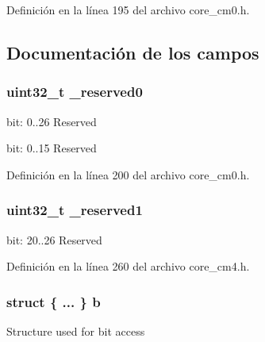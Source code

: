 Definición en la línea 195 del archivo core\+\_\+cm0.\+h.



\subsection{Documentación de los campos}
\subsubsection[{\texorpdfstring{\+\_\+reserved0}{_reserved0}}]{\setlength{\rightskip}{0pt plus 5cm}uint32\+\_\+t \+\_\+reserved0}\hypertarget{union_a_p_s_r___type_ac8a6a13838a897c8d0b8bc991bbaf7c1}{}\label{union_a_p_s_r___type_ac8a6a13838a897c8d0b8bc991bbaf7c1}
bit\+: 0..26 Reserved

bit\+: 0..15 Reserved 

Definición en la línea 200 del archivo core\+\_\+cm0.\+h.

\subsubsection[{\texorpdfstring{\+\_\+reserved1}{_reserved1}}]{\setlength{\rightskip}{0pt plus 5cm}uint32\+\_\+t \+\_\+reserved1}\hypertarget{union_a_p_s_r___type_a959a73d8faee56599b7e792a7c5a2d16}{}\label{union_a_p_s_r___type_a959a73d8faee56599b7e792a7c5a2d16}
bit\+: 20..26 Reserved 

Definición en la línea 260 del archivo core\+\_\+cm4.\+h.

\subsubsection[{\texorpdfstring{b}{b}}]{\setlength{\rightskip}{0pt plus 5cm}struct \{ ... \}   b}\hypertarget{union_a_p_s_r___type_a2e5b85cff450c7f92c7388dd09f10065}{}\label{union_a_p_s_r___type_a2e5b85cff450c7f92c7388dd09f10065}
Structure used for bit access 
